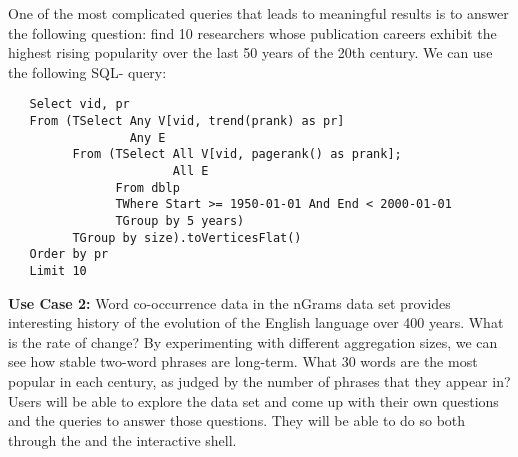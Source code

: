 One of the most complicated queries that leads to meaningful results
is to answer the following question: find 10 researchers whose
publication careers exhibit the highest rising popularity over the
last 50 years of the 20th century.  We can use the following SQL-\ql
query:

\begin{small}
\begin{verbatim}
   Select vid, pr
   From (TSelect Any V[vid, trend(prank) as pr]
                 Any E
         From (TSelect All V[vid, pagerank() as prank]; 
                       All E
               From dblp
               TWhere Start >= 1950-01-01 And End < 2000-01-01
               TGroup by 5 years)
         TGroup by size).toVerticesFlat()
   Order by pr
   Limit 10
\end{verbatim}
\end{small}

{\bf Use Case 2:} Word co-occurrence data in the nGrams data set
provides interesting history of the evolution of the English language
over 400 years.  What is the rate of change?  By experimenting with
different aggregation sizes, we can see how stable two-word phrases
are long-term.  What 30 words are the most popular in each century, as
judged by the number of phrases that they appear in?  Users will be
able to explore the data set and come up with their own questions and
the queries to answer those questions.  They will be able to do so
both through the \qlui and the interactive shell.

